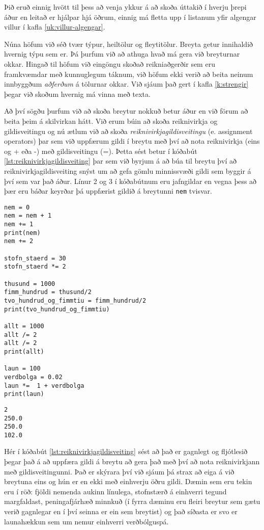 Þið eruð einnig hvött til þess að venja ykkur á að skoða úttakið í hverju þrepi áður en leitað er hjálpar hjá öðrum, einnig má fletta upp í listanum yfir algengar villur í kafla \ref{uk:villur-algengar}.


Núna höfum við séð tvær týpur, heiltölur og fleytitölur.
Breyta getur innihaldið hvernig týpu sem er.
Þá þurfum við að athuga hvað má gera við breyturnar okkar.
Hingað til höfum við eingöngu skoðað reikniaðgerðir sem eru framkvæmdar með kunnuglegum táknum, við höfum ekki verið að beita neinum innbyggðum \textit{aðferðum} á tölurnar okkar.
Við sjáum það gert í kafla \ref{k:strengir} þegar við skoðum hvernig má vinna með texta.

Að því sögðu þurfum við að skoða breytur nokkuð betur áður en við förum að beita þeim á skilvirkan hátt.
Við erum búin að skoða reiknivirkja og gildisveitingu og nú ætlum við að skoða \textit{reiknivirkjagildisveitingu} (e. assignment operators) þar sem við uppfærum gildi í breytu með því að nota reiknivirkja (eins og + eða -) með gildisveitingu (=).
Þetta sést betur í kóðabút \ref{lst:reiknivirkjagildisveiting} þar sem við byrjum á að búa til breytu því að reiknivirkjagildisveiting snýst um að gefa gömlu minnissvæði gildi sem byggir á því sem var það áður.
Línur 2 og 3 í kóðabútnum eru jafngildar en vegna þess að þær eru báðar keyrðar þá uppfærist gildið á breytunni \texttt{nem} tvisvar.

\begin{lstlisting}[caption=Reiknivirkjagildisveiting, label=lst:reiknivirkjagildisveiting]
nem = 0
nem = nem + 1
nem += 1
print(nem)
nem += 2

stofn_staerd = 30
stofn_staerd *= 2 

thusund = 1000
fimm_hundrud = thusund/2
tvo_hundrud_og_fimmtiu = fimm_hundrud/2
print(tvo_hundrud_og_fimmtiu)

allt = 1000
allt /= 2
allt /= 2
print(allt)

laun = 100
verdbolga = 0.02
laun *=  1 + verdbolga
print(laun)
\end{lstlisting}
\lstset{style=uttak}
\begin{lstlisting}
2
250.0
250.0
102.0
\end{lstlisting}
\lstset{style=venjulegt}

Hér í kóðabút \ref{lst:reiknivirkjagildisveiting} sést að það er gagnlegt og fljótlesið þegar það á að uppfæra gildi á breytu að gera það með því að nota reiknivirkjann með gildisveitingunni.
Það er skýrara því við sjáum þá strax að eiga á við breytuna eins og hún er en ekki með einhverju öðru gildi.
Dæmin sem eru tekin eru í röð: fjöldi nemenda aukinn línulega, stofnstærð á einhverri tegund margfaldast, peningafjárhæð minnkuð (í fyrra dæminu eru fleiri breytur sem gætu verið gagnlegar en í því seinna er ein sem breytist) og það síðasta er svo er launahækkun sem um nemur einhverri verðbólguspá.

